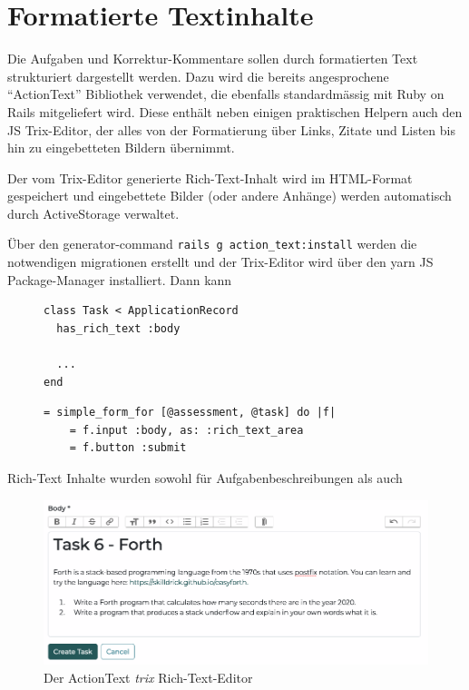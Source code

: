 \section{Formatierte Textinhalte}

Die Aufgaben und Korrektur-Kommentare sollen durch formatierten Text strukturiert dargestellt werden.
Dazu wird die bereits angesprochene \enquote{ActionText} Bibliothek verwendet, die ebenfalls standardmässig mit Ruby on Rails mitgeliefert wird.
Diese enthält neben einigen praktischen Helpern auch den JS Trix-Editor, der alles von der Formatierung über Links, Zitate und Listen bis hin zu eingebetteten Bildern übernimmt. 

Der vom Trix-Editor generierte Rich-Text-Inhalt wird im HTML-Format gespeichert und eingebettete Bilder (oder andere Anhänge) werden automatisch durch ActiveStorage verwaltet.

Über den generator-command \texttt{rails g action_text:install} werden die notwendigen migrationen erstellt und
der Trix-Editor wird über den yarn JS Package-Manager installiert. Dann kann 

\begin{figure}[H]
\begin{codebox}
\begin{verbatim}
class Task < ApplicationRecord
  has_rich_text :body
  
  ...
end
\end{verbatim}
\end{codebox}
\end{figure}

\begin{figure}[H]
\begin{codebox}
\begin{verbatim}
= simple_form_for [@assessment, @task] do |f|
    = f.input :body, as: :rich_text_area
    = f.button :submit
\end{verbatim}
\end{codebox}
\end{figure}

Rich-Text Inhalte wurden sowohl für Aufgabenbeschreibungen als auch 

\begin{figure}[H]
  \centering
  \includegraphics[width=14cm]{images/trix.png}
  \caption{Der ActionText \emph{trix} Rich-Text-Editor}
\end{figure}
